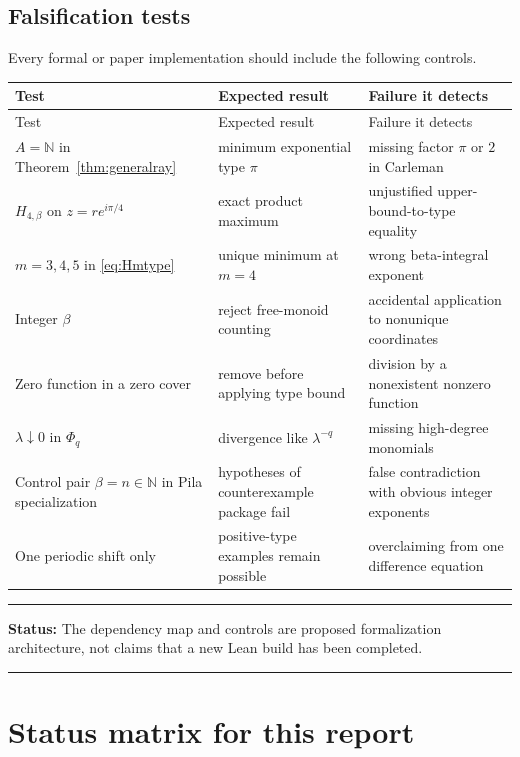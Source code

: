 \documentclass[11pt,oneside]{article}
\theoremstyle{definition}
\theoremstyle{remark}
\newcommand{\N}{\mathbb N}
\newenvironment{statusbox}[1]
{\begin{center}\begin{minipage}{0.94\textwidth}\raggedright\hrule\vspace{0.45em}\textbf{Status:} #1\par\vspace{0.35em}}
{\vspace{0.35em}\hrule\end{minipage}\end{center}}
\begin{document}
\subsection{Falsification tests}

Every formal or paper implementation should include the following controls.

\begin{longtable}{@{}p{}p{}p{}@{}}
\toprule
Test & Expected result & Failure it detects\\
\midrule
\endfirsthead
\toprule
Test & Expected result & Failure it detects\\
\midrule
\endhead
$A=\N$ in Theorem~\ref{thm:generalray} & minimum exponential type $\pi$ & missing factor $\pi$ or $2$ in Carleman\\
$H_{4,\beta}$ on $z=r e^{i\pi/4}$ & exact product maximum & unjustified upper-bound-to-type equality\\
$m=3,4,5$ in \eqref{eq:Hmtype} & unique minimum at $m=4$ & wrong beta-integral exponent\\
Integer $\beta$ & reject free-monoid counting & accidental application to nonunique coordinates\\
Zero function in a zero cover & remove before applying type bound & division by a nonexistent nonzero function\\
$\lambda\downarrow0$ in $\Phi_q$ & divergence like $\lambda^{-q}$ & missing high-degree monomials\\
Control pair $\beta=n\in\N$ in Pila specialization & hypotheses of counterexample package fail & false contradiction with obvious integer exponents\\
One periodic shift only & positive-type examples remain possible & overclaiming from one difference equation\\
\bottomrule
\end{longtable}

\begin{statusbox}{The dependency map and controls are proposed formalization architecture,
not claims that a new Lean build has been completed.}
\end{statusbox}

\section{Status matrix for this report}
\label{sec:status}
\end{document}
